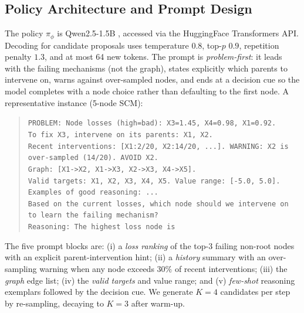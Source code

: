 \documentclass[twoside]{article}
\theoremstyle{plain}
\theoremstyle{definition}
\theoremstyle{remark}
\begin{document}
\subsection{Policy Architecture and Prompt Design}
\label{app:policy}

The policy $\pi_\phi$ is Qwen2.5-1.5B \citep{qwen2_5}, accessed via the HuggingFace Transformers API. Decoding for candidate proposals uses temperature $0.8$, top-$p$ $0.9$, repetition penalty $1.3$, and at most 64 new tokens. The prompt is \emph{problem-first}: it leads with the failing mechanisms (not the graph), states explicitly which parents to intervene on, warns against over-sampled nodes, and ends at a decision cue so the model completes with a node choice rather than defaulting to the first node. A representative instance (5-node SCM):
\begin{quote}\small
\texttt{PROBLEM: Node losses (high=bad): X3=1.45, X4=0.98, X1=0.92.}\\
\texttt{To fix X3, intervene on its parents: X1, X2.}\\
\texttt{Recent interventions: [X1:2/20, X2:14/20, ...]. WARNING: X2 is}\\
\texttt{over-sampled (14/20). AVOID X2.}\\
\texttt{Graph: [X1->X2, X1->X3, X2->X3, X4->X5].}\\
\texttt{Valid targets: X1, X2, X3, X4, X5. Value range: [-5.0, 5.0].}\\
\texttt{Examples of good reasoning: ...}\\
\texttt{Based on the current losses, which node should we intervene on}\\
\texttt{to learn the failing mechanism?}\\
\texttt{Reasoning: The highest loss node is}
\end{quote}
The five prompt blocks are: (i) a \emph{loss ranking} of the top-3 failing non-root nodes with an explicit parent-intervention hint; (ii) a \emph{history} summary with an over-sampling warning when any node exceeds $30\%$ of recent interventions; (iii) the \emph{graph} edge list; (iv) the \emph{valid targets} and value range; and (v) \emph{few-shot} reasoning exemplars followed by the decision cue. We generate $K=4$ candidates per step by re-sampling, decaying to $K=3$ after warm-up.
\end{document}
